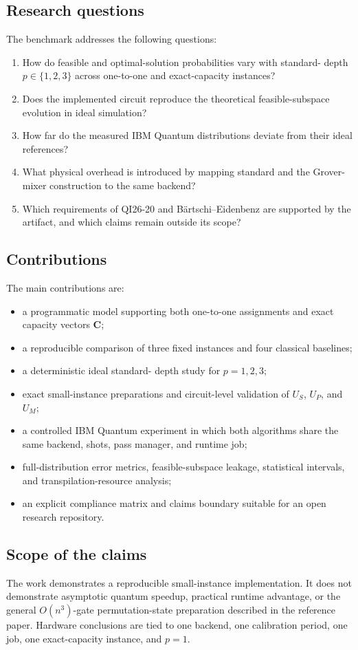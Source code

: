 \subsection{Research questions}

The benchmark addresses the following questions:
\begin{enumerate}
  \item How do feasible and optimal-solution probabilities vary with standard-\QAOA{} depth $p\in\{1,2,3\}$ across one-to-one and exact-capacity instances?
  \item Does the implemented \GMQAOA{} circuit reproduce the theoretical feasible-subspace evolution in ideal simulation?
  \item How far do the measured IBM Quantum distributions deviate from their ideal references?
  \item What physical overhead is introduced by mapping standard \QAOA{} and the Grover-mixer construction to the same backend?
  \item Which requirements of QI26-20 and Bärtschi--Eidenbenz are supported by the artifact, and which claims remain outside its scope?
\end{enumerate}

\subsection{Contributions}

The main contributions are:
\begin{itemize}
  \item a programmatic \QUBO{} model supporting both one-to-one assignments and exact capacity vectors $\bm C$;
  \item a reproducible comparison of three fixed instances and four classical baselines;
  \item a deterministic ideal standard-\QAOA{} depth study for $p=1,2,3$;
  \item exact small-instance \GMQAOA{} preparations and circuit-level validation of $U_S$, $U_P$, and $U_M$;
  \item a controlled IBM Quantum experiment in which both algorithms share the same backend, shots, pass manager, and runtime job;
  \item full-distribution error metrics, feasible-subspace leakage, statistical intervals, and transpilation-resource analysis;
  \item an explicit compliance matrix and claims boundary suitable for an open research repository.
\end{itemize}

\subsection{Scope of the claims}

The work demonstrates a reproducible small-instance implementation. It does not demonstrate asymptotic quantum speedup, practical runtime advantage, or the general $O(n^3)$-gate permutation-state preparation described in the reference paper. Hardware conclusions are tied to one backend, one calibration period, one job, one exact-capacity instance, and $p=1$.
